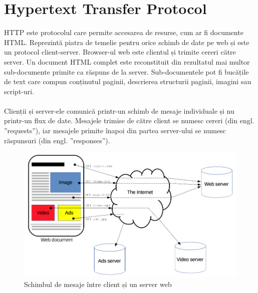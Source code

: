 \section{Hypertext Transfer Protocol}
HTTP este protocolul care permite accesarea de resurse, cum ar fi documente HTML. Reprezintă piatra de temelie pentru orice schimb de date pe web și este un protocol client-server. Browser-ul web este clientul și trimite cereri către server. Un document HTML complet este reconstituit din rezultatul mai multor sub-documente primite ca răspuns de la server. Sub-documentele pot fi bucățile de text care compun conținutul paginii, descrierea structurii paginii, imagini sau script-uri.
\\ \\
Clienții și server-ele comunică printr-un schimb de mesaje individuale și nu printr-un flux de date. Mesajele trimise de către client se numesc cereri (din engl. ”requests”), iar mesajele primite înapoi din partea server-ului se numesc răspunsuri (din engl. ”responses”).

\begin{figure}[!htb]
	\centering
	\includegraphics[width=1\textwidth]
	{../LaTeX/Images/http_fetch.PNG}
	\caption{Schimbul de mesaje între client și un server web}
	\label{fig:21}
\end{figure}

